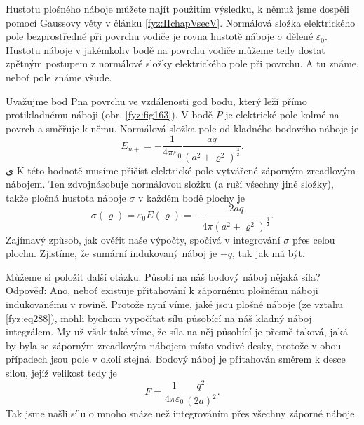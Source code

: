     Hustotu plošného náboje můžete najít použitím výsledku, k němuž jsme dospěli pomocí Gaussovy 
    věty v článku \ref{fyz:IIchapVsecV}. Normálová složka elektrického pole bezprostředně při 
    povrchu vodiče je rovna hustotě náboje \(\sigma\) dělené \(\varepsilon_0\). Hustotu náboje v 
    jakémkoliv bodě na povrchu vodiče můžeme tedy dostat zpětným postupem z normálové složky 
    elektrického pole při povrchu. A tu známe, neboť pole známe všude.
    
    Uvažujme bod Pna povrchu ve vzdálenosti god bodu, který leží přímo protikladnému náboji (obr. 
    \ref{fyz:fig163}). V bodě \(P\) je elektrické pole kolmé na povrch a směřuje k němu. Normálová 
    složka pole od kladného bodového náboje je
    \begin{equation}\label{fyz:eq287}
     E_{n+} = -\dfrac{1}{4\pi\varepsilon_0}\frac{aq}{(a^2+\varrho^2)^{\frac{3}{2}}}.
    \end{equation}    ی
    K této hodnotě musíme přičíst elektrické pole vytvářené záporným zrcadlovým nábojem. Ten 
    zdvojnásobuje normálovou složku (a ruší všechny jiné složky), takže plošná hustota náboje 
    \(\sigma\) v každém bodě plochy je
    \begin{equation}\label{fyz:eq288}
     \sigma(\varrho) = \varepsilon_0E(\varrho) = -\frac{2aq}{4\pi(a^2+\varrho^2)^{\frac{3}{2}}}.
    \end{equation} 
    Zajímavý způsob, jak ověřit naše výpočty, spočívá v integrování \(\sigma\) přes celou 
    plochu. Zjistíme, že sumární indukovaný náboj je \(-q\), tak jak má být. 
    
    Můžeme si položit další otázku. Působí na náš bodový náboj nějaká síla? Odpověď: Ano, neboť
    existuje přitahování k zápornému plošnému náboji indukovanému v rovině. Protože nyní víme, jaké 
    jsou plošné náboje (ze vztahu \ref{fyz:eq288}), mohli bychom vypočítat sílu působící na náš 
    kladný náboj integrálem. My už však také víme, že síla na něj působící je přesně taková, jaká 
    by byla se záporným zrcadlovým nábojem místo vodivé desky, protože v obou případech jsou pole v 
    okolí stejná. Bodový náboj je přitahován směrem k desce silou, jejíž velikost tedy je
    \begin{equation}\label{fyz:eq289}
     F = \dfrac{1}{4\pi\varepsilon_0}\frac{q^2}{(2a)^2}.
    \end{equation} 
    Tak jsme našli sílu o mnoho snáze než integrováním přes všechny záporné náboje.
    
